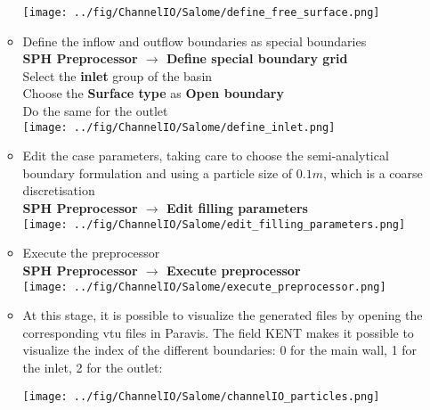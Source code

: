 \documentclass{../GPUSPHtemplate}
\begin{document}
\begin{enumerate}
\begin{itemize}
    \texttt{[image: ../fig/ChannelIO/Salome/define\_free\_surface.png]}
  \item Define the inflow and outflow boundaries as special boundaries\\
    \textbf{SPH Preprocessor $\to$ Define special boundary grid}\smallskip\\
    Select the \textbf{inlet} group of the basin\\
    Choose the \textbf{Surface type} as \textbf{Open boundary}\\
    Do the same for the outlet\\
    \texttt{[image: ../fig/ChannelIO/Salome/define\_inlet.png]}
  \item Edit the case parameters, taking care to choose the semi-analytical boundary formulation and using a particle size of $0.1m$,
    which is a coarse discretisation\\
    \textbf{SPH Preprocessor $\to$ Edit filling parameters}\\
    \texttt{[image: ../fig/ChannelIO/Salome/edit\_filling\_parameters.png]}
  \item Execute the preprocessor\\
    \textbf{SPH Preprocessor $\to$ Execute preprocessor}\smallskip\\
    \texttt{[image: ../fig/ChannelIO/Salome/execute\_preprocessor.png]}
  \item At this stage, it is possible to visualize the generated files by opening the corresponding vtu files in Paravis.
    The field KENT makes it possible to visualize the index of the different boundaries: 0 for the main wall, 1 for the inlet,
    2 for the outlet:\\
    \begin{center}\texttt{[image: ../fig/ChannelIO/Salome/channelIO\_particles.png]}\end{center}
    

\end{itemize}
\end{enumerate}
\end{document}
